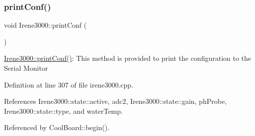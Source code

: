 \subsubsection{\texorpdfstring{print\+Conf()}{printConf()}}
{\footnotesize\ttfamily void Irene3000\+::print\+Conf (\begin{DoxyParamCaption}{ }\end{DoxyParamCaption})}

\hyperlink{classIrene3000_a7bc2414100b5e19eacc6630fa34b2654}{Irene3000\+::print\+Conf()}\+: This method is provided to print the configuration to the Serial Monitor 

Definition at line 307 of file irene3000.\+cpp.



References Irene3000\+::state\+::active, adc2, Irene3000\+::state\+::gain, ph\+Probe, Irene3000\+::state\+::type, and water\+Temp.



Referenced by Cool\+Board\+::begin().


